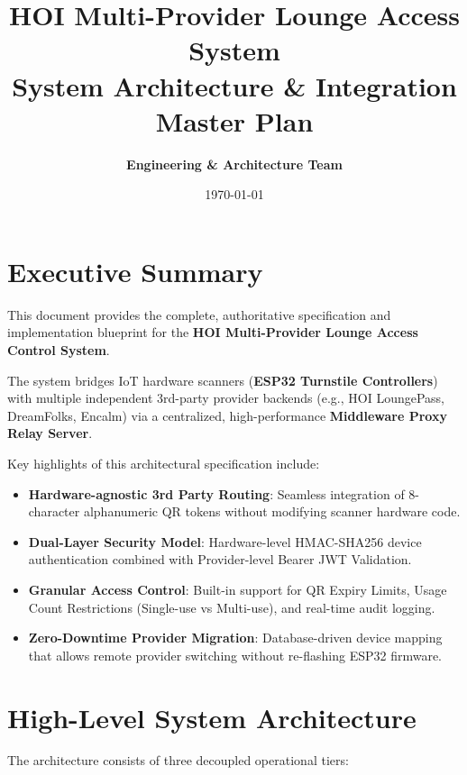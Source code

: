 \documentclass[12pt,a4paper]{article}
\title{\textbf{\Large HOI Multi-Provider Lounge Access System}\\[0.5em] \Large System Architecture \& Integration Master Plan}
\author{\textbf{Engineering \& Architecture Team}}
\date{\today}
\begin{document}
\maketitle
\tableofcontents
\newpage

\section{Executive Summary}
This document provides the complete, authoritative specification and implementation blueprint for the \textbf{HOI Multi-Provider Lounge Access Control System}.

The system bridges IoT hardware scanners (\textbf{ESP32 Turnstile Controllers}) with multiple independent 3rd-party provider backends (e.g., HOI LoungePass, DreamFolks, Encalm) via a centralized, high-performance \textbf{Middleware Proxy Relay Server}.

Key highlights of this architectural specification include:
\begin{itemize}[noitemsep]
    \item \textbf{Hardware-agnostic 3rd Party Routing}: Seamless integration of 8-character alphanumeric QR tokens without modifying scanner hardware code.
    \item \textbf{Dual-Layer Security Model}: Hardware-level HMAC-SHA256 device authentication combined with Provider-level Bearer JWT Validation.
    \item \textbf{Granular Access Control}: Built-in support for QR Expiry Limits, Usage Count Restrictions (Single-use vs Multi-use), and real-time audit logging.
    \item \textbf{Zero-Downtime Provider Migration}: Database-driven device mapping that allows remote provider switching without re-flashing ESP32 firmware.
\end{itemize}

\section{High-Level System Architecture}

The architecture consists of three decoupled operational tiers:
\end{document}
